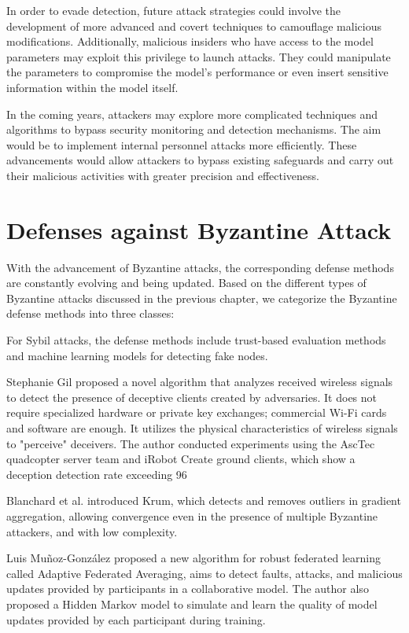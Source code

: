 \documentclass[conference]{IEEEtran}
\begin{document}
In order to evade detection, future attack strategies could involve the development of more advanced 
and covert techniques to camouflage malicious modifications. Additionally, malicious insiders who 
have access to the model parameters may exploit this privilege to launch attacks. They could
manipulate the parameters to compromise the model's performance or even insert sensitive
information within the model itself.

In the coming years, attackers may explore more complicated techniques and algorithms to 
bypass security monitoring and detection mechanisms. The aim would be to implement internal
personnel attacks more efficiently. These advancements would allow attackers to bypass 
existing safeguards and carry out their malicious activities with greater precision and 
effectiveness.


\section{Defenses against Byzantine Attack}

With the advancement of Byzantine attacks, the corresponding defense methods are constantly evolving and being updated.
Based on the different types of Byzantine attacks discussed in the previous chapter, we categorize the Byzantine defense methods into three classes:

For Sybil attacks, the defense methods include trust-based evaluation methods and machine learning models for detecting fake nodes.

Stephanie Gil \cite{b125} proposed a novel algorithm that analyzes received wireless signals to 
detect the presence of deceptive clients created by adversaries. It does not require specialized
hardware or private key exchanges; commercial Wi-Fi cards and software are enough. It utilizes 
the physical characteristics of wireless signals to "perceive" deceivers. The author conducted 
experiments using the AscTec quadcopter server team and iRobot Create ground clients, which show 
a deception detection rate exceeding 96%


Blanchard et al. \cite{b126} introduced Krum, which detects and removes outliers in gradient aggregation, allowing convergence
even in the presence of multiple Byzantine attackers, and with low complexity.

Luis Muñoz-González \cite{b127} proposed a new algorithm for robust federated learning called 
Adaptive Federated Averaging, aims to detect faults, attacks, and malicious updates provided 
by participants in a collaborative model. The author also proposed a Hidden Markov model to simulate
and learn the quality of model updates provided by each participant during training.
\end{document}
